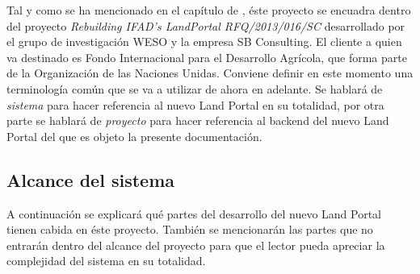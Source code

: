 Tal y como se ha mencionado en el capítulo de , éste proyecto se encuadra dentro del proyecto \textit{Rebuilding IFAD's LandPortal RFQ/2013/016/SC} desarrollado por el grupo de investigación WESO y la empresa SB Consulting. El cliente a quien va destinado es Fondo Internacional para el Desarrollo Agrícola, que forma parte de la Organización de las Naciones Unidas.
Conviene definir en este momento una terminología común que se va a utilizar de ahora en adelante.  Se hablará de \textit{sistema} para hacer referencia al nuevo Land Portal en su totalidad, por otra parte se hablará de \textit{proyecto} para hacer referencia al backend del nuevo Land Portal del que es objeto la presente documentación.


\subsection{Alcance del sistema}
A continuación se explicará qué partes del desarrollo del nuevo Land Portal tienen cabida en éste proyecto.  También se mencionarán las partes que no entrarán dentro del alcance del proyecto para que el lector pueda apreciar la complejidad del sistema en su totalidad.

